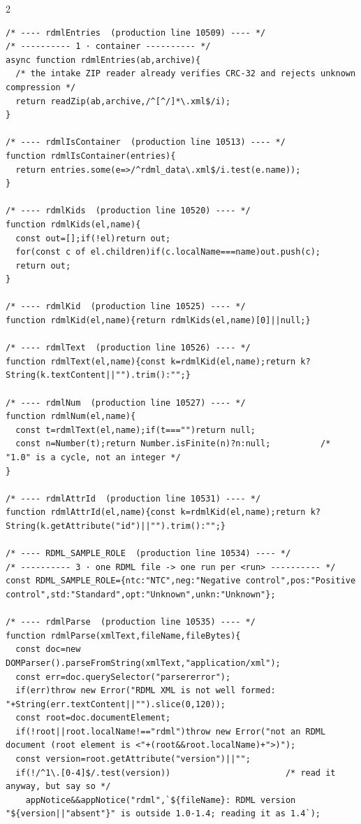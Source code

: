 \begin{multicols}{2}
\begin{lstlisting}[style=jstiny]
/* ---- rdmlEntries  (production line 10509) ---- */
/* ---------- 1 · container ---------- */
async function rdmlEntries(ab,archive){
  /* the intake ZIP reader already verifies CRC-32 and rejects unknown compression */
  return readZip(ab,archive,/^[^/]*\.xml$/i);
}

/* ---- rdmlIsContainer  (production line 10513) ---- */
function rdmlIsContainer(entries){
  return entries.some(e=>/^rdml_data\.xml$/i.test(e.name));
}

/* ---- rdmlKids  (production line 10520) ---- */
function rdmlKids(el,name){
  const out=[];if(!el)return out;
  for(const c of el.children)if(c.localName===name)out.push(c);
  return out;
}

/* ---- rdmlKid  (production line 10525) ---- */
function rdmlKid(el,name){return rdmlKids(el,name)[0]||null;}

/* ---- rdmlText  (production line 10526) ---- */
function rdmlText(el,name){const k=rdmlKid(el,name);return k?String(k.textContent||"").trim():"";}

/* ---- rdmlNum  (production line 10527) ---- */
function rdmlNum(el,name){
  const t=rdmlText(el,name);if(t==="")return null;
  const n=Number(t);return Number.isFinite(n)?n:null;          /* "1.0" is a cycle, not an integer */
}

/* ---- rdmlAttrId  (production line 10531) ---- */
function rdmlAttrId(el,name){const k=rdmlKid(el,name);return k?String(k.getAttribute("id")||"").trim():"";}

/* ---- RDML_SAMPLE_ROLE  (production line 10534) ---- */
/* ---------- 3 · one RDML file -> one run per <run> ---------- */
const RDML_SAMPLE_ROLE={ntc:"NTC",neg:"Negative control",pos:"Positive control",std:"Standard",opt:"Unknown",unkn:"Unknown"};

/* ---- rdmlParse  (production line 10535) ---- */
function rdmlParse(xmlText,fileName,fileBytes){
  const doc=new DOMParser().parseFromString(xmlText,"application/xml");
  const err=doc.querySelector("parsererror");
  if(err)throw new Error("RDML XML is not well formed: "+String(err.textContent||"").slice(0,120));
  const root=doc.documentElement;
  if(!root||root.localName!=="rdml")throw new Error("not an RDML document (root element is <"+(root&&root.localName)+">)");
  const version=root.getAttribute("version")||"";
  if(!/^1\.[0-4]$/.test(version))                       /* read it anyway, but say so */
    appNotice&&appNotice("rdml",`${fileName}: RDML version "${version||"absent"}" is outside 1.0-1.4; reading it as 1.4`);


\end{lstlisting}
\end{multicols}
